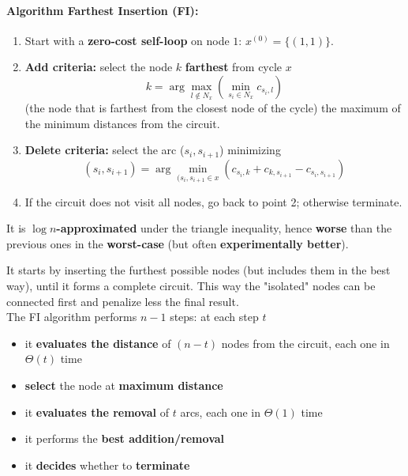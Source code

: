\documentclass[11pt]{article}
\begin{document}
	\paragraph{Algorithm Farthest Insertion (FI):}
	\begin{enumerate}
		\item Start with a \textbf{zero-cost self-loop} on node $1$: $x^{(0)} = \{(1, 1)\}$.\\
		
		\item \textbf{Add criteria:} select the node $k$ \textbf{farthest} from cycle $x$
		$$ k = \arg \max_{l \notin N_x} \left(\min_{s_i \in N_x} c_{s_i, l}\right) $$
		(the node that is farthest from the closest node of the cycle) the maximum of the minimum distances from the circuit.\\
		
		\item \textbf{Delete criteria:} select the arc ($s_i , s_{i+1}$) minimizing
		$$ (s_i, s_{i+1}) = \arg \min_{(s_i, s_{i+1} \in x} \left(c_{s_i, k} + c_{k, s_{i+1}} - c_{s_i, s_{i+1}} \right) $$
		
		\item If the circuit does not visit all nodes, go back to point 2; otherwise terminate.\\
	\end{enumerate}
	
	It is \textbf{$\log n$-approximated} under the triangle inequality, hence \textbf{worse} than the previous ones in the \textbf{worst-case} (but often \textbf{experimentally better}).\\
	
	\newpage
	
	It starts by inserting the furthest possible nodes (but includes them in the best way), until it forms a complete circuit. This way the "isolated" nodes can be connected first and penalize less the final result.\\
	
	The FI algorithm performs $n - 1$ steps: at each step $t$
	\begin{itemize}
		\item it \textbf{evaluates the distance} of $(n - t)$ nodes from the circuit, each one in $\Theta (t)$ time
		\item \textbf{select} the node at \textbf{maximum distance}
		\item it \textbf{evaluates the removal} of $t$ arcs, each one in $\Theta (1)$ time
		\item it performs the \textbf{best addition/removal}
		\item it \textbf{decides} whether to \textbf{terminate}
	\end{itemize}
	
\end{document}
